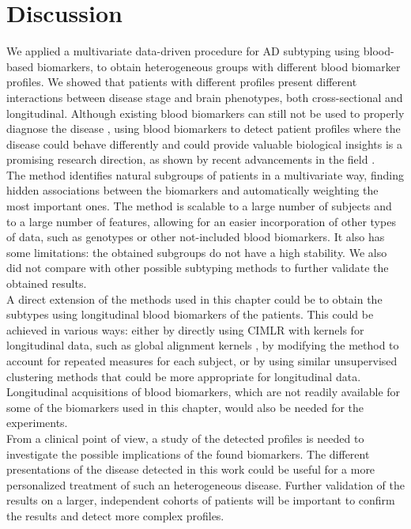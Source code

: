 \section{Discussion}
\label{conclusions}

We applied a multivariate data-driven procedure for AD subtyping using blood-based biomarkers, to obtain heterogeneous groups with different blood biomarker profiles. We showed that patients with different profiles present different interactions between disease stage and brain phenotypes, both cross-sectional and longitudinal. Although existing blood biomarkers can still not be used to properly diagnose the disease \cite{Schneider2009,Gupta2016,Lovheim2017}, using blood biomarkers to detect patient profiles where the disease could behave differently and could provide valuable biological insights is a promising research direction, as shown by recent advancements in the field \cite{Cullen2020,Moscoso2020}.  \\

The method identifies natural subgroups of patients in a multivariate way, finding hidden associations between the biomarkers and automatically weighting the most important ones. The method is scalable to a large number of subjects and to a large number of features, allowing for an easier incorporation of other types of data, such as genotypes or other not-included blood biomarkers. It also has some limitations: the obtained subgroups do not have a high stability. We also did not compare with other possible subtyping methods to further validate the obtained results. \\

A direct extension of the methods used in this chapter could be to obtain the subtypes using longitudinal blood biomarkers of the patients. This could be achieved in various ways: either by directly using CIMLR with kernels for longitudinal data, such as global alignment kernels \cite{Cuturi2011}, by modifying the method to account for repeated measures for each subject, or by using similar unsupervised clustering methods that could be more appropriate for longitudinal data. Longitudinal acquisitions of blood biomarkers, which are not readily available for some of the biomarkers used in this chapter, would also be needed for the experiments. \\

From a clinical point of view, a study of the detected profiles is needed to investigate the possible implications of the found biomarkers. The different presentations of the disease detected in this work could be useful for a more personalized treatment of such an heterogeneous disease. Further validation of the results on a larger, independent cohorts of patients will be important to confirm the results and detect more complex profiles.  \\


